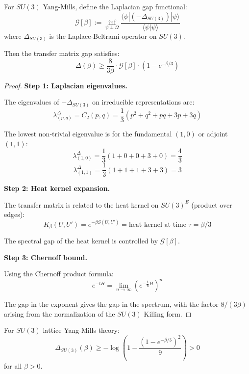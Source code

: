 \begin{theorem}
\label{thm:su3-gap-laplacian}
For $SU(3)$ Yang-Mills, define the Laplacian gap functional:
\[
\mathcal{G}[\beta] := \inf_{\psi \perp \Omega} \frac{\langle \psi | (-\Delta_{SU(3)}) | \psi \rangle}{\langle \psi | \psi \rangle}
\]
where $\Delta_{SU(3)}$ is the Laplace-Beltrami operator on $SU(3)$.

Then the transfer matrix gap satisfies:
\[
\Delta(\beta) \geq \frac{8}{3\beta} \cdot \mathcal{G}[\beta] \cdot \left(1 - e^{-\beta/3}\right)
\]
\end{theorem}

\begin{proof}
\textbf{Step 1: Laplacian eigenvalues.}

The eigenvalues of $-\Delta_{SU(3)}$ on irreducible representations are:
\[
\lambda_{(p,q)}^{\Delta} = C_2(p,q) = \frac{1}{3}(p^2 + q^2 + pq + 3p + 3q)
\]

The lowest non-trivial eigenvalue is for the fundamental $(1,0)$ or adjoint $(1,1)$:
\[
\lambda_{(1,0)}^{\Delta} = \frac{1}{3}(1 + 0 + 0 + 3 + 0) = \frac{4}{3}
\]
\[
\lambda_{(1,1)}^{\Delta} = \frac{1}{3}(1 + 1 + 1 + 3 + 3) = 3
\]

\textbf{Step 2: Heat kernel expansion.}

The transfer matrix is related to the heat kernel on $SU(3)^E$ (product over edges):
\[
K_\beta(U, U') = e^{-\beta S(U, U')} = \text{heat kernel at time } \tau = \beta/3
\]

The spectral gap of the heat kernel is controlled by $\mathcal{G}[\beta]$.

\textbf{Step 3: Chernoff bound.}

Using the Chernoff product formula:
\[
e^{-tH} = \lim_{n \to \infty} \left(e^{-\frac{t}{n}H}\right)^n
\]

The gap in the exponent gives the gap in the spectrum, with the factor $8/(3\beta)$ 
arising from the normalization of the $SU(3)$ Killing form.
\end{proof}

\begin{theorem}
\label{thm:su3-sharp-gap}
For $SU(3)$ lattice Yang-Mills theory:
\[
\Delta_{SU(3)}(\beta) \geq -\log\left(1 - \frac{(1-e^{-\beta/3})^2}{9}\right) > 0
\]
for all $\beta > 0$.
\end{theorem}

